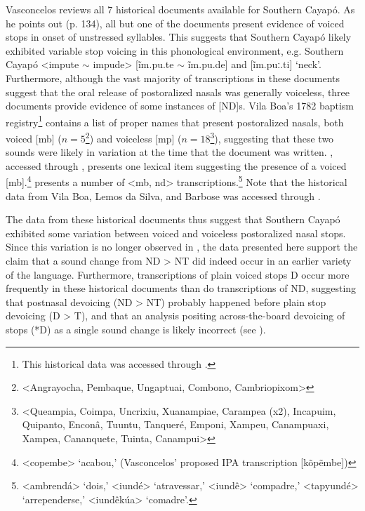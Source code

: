 \documentclass[output=paper,hidelinks]{langscibook}
\begin{document}
\begin{sloppypar}
Vasconcelos reviews all 7 historical documents available for Southern Cayap\'o. As he points out (p. 134), all but one \citep{Ehrenreich1894} of the documents present evidence of voiced stops in onset of unstressed syllables. This suggests that Southern Cayap\'o likely exhibited variable stop voicing in this phonological environment,
e.g. Southern Cayap\'o <impute $\sim$ impude> [\~im.\textprimstress pu.te $\sim$ \~im.\textprimstress pu.de] and  [\~im.\textprimstress puː.ti] `neck'.
Furthermore, although the vast majority of transcriptions in these documents suggest that the oral release of postoralized nasals was generally voiceless, three documents provide evidence of some instances of [ND]s. Vila Boa's 1782 baptism registry\footnote{This historical data was accessed through \citet{Vasconcelos2013}.} contains a list of proper names that present postoralized nasals, both voiced [mb] ($n=5$\footnote{<Angrayocha, Pembaque, Ungaptuai, Combono, Cambriopixom>}) and voiceless [mp] ($n=18$\footnote{<Queampia, Coimpa, Uncrixiu, Xuanampiae, Carampea (x2), Incapuim, Quipanto, Encon\^a, Tuuntu, Tanquer\'e, Emponi, Xampeu, Canampuaxi, Xampea, Cananquete, Tuinta, Canampui>}), suggesting that these two sounds were likely in variation at the time that the document was written. \citet{LemosdaSilva1882}, accessed through \citet{Vasconcelos2013}, presents one lexical item suggesting the presence of a voiced [mb].\footnote{<copembe> `acabou,' (Vasconcelos' proposed IPA transcription [k\~op\~embe])} \citet{Barbosa1918} presents a number of <mb, nd> transcriptions.\footnote{<ambrend\'a> `dois,' <iund\'e> `atravessar,' <iund\^e> `compadre,' <tapyund\'e> `arrependerse,' <iund\^ek\'ua> `comadre'.} Note that the historical data from Vila Boa, Lemos da Silva, and Barbose was accessed through \citet{Vasconcelos2013}.
\end{sloppypar}

The data from these historical documents thus suggest that Southern Cayap\'o exhibited some variation between voiced and voiceless postoralized nasal stops. Since this variation is no longer observed in , the data presented here support the claim that a sound change from ND > NT did indeed occur in an earlier variety of the language. Furthermore, transcriptions of plain voiced stops D occur more frequently in these historical documents than do transcriptions of ND, suggesting that postnasal devoicing (ND > NT) probably happened before plain stop devoicing (D > T), and that an analysis positing across-the-board devoicing of stops (*D) as a single sound change is likely incorrect (see ).
\end{document}

